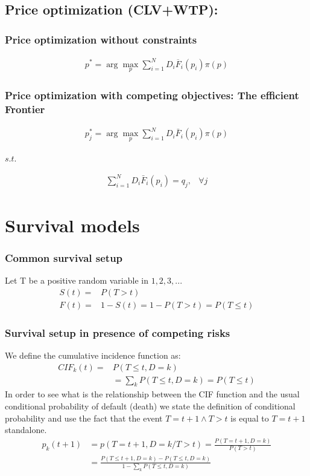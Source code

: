 \documentclass[12pt]{book}
\begin{document}
\section{Price optimization (CLV+WTP): }
\subsection{Price optimization without constraints}
\begin{align}
p^*= \arg \max_p \sum_{i=1}^N D_i\overline{F}_i(p_i)\pi(p)
\end{align}

\subsection{Price optimization with competing objectives: The efficient Frontier}

\begin{align}
p^*_j= \arg \max_p \sum_{i=1}^N D_i\bar{F}_i(p_i)\pi(p)
\end{align}
\begin{center}
    $s.t.$
\end{center}
\begin{align}
\sum_{i=1}^N D_i\bar{F}_i(p_i) =q_j,& \forall j
\end{align}


\chapter{Survival models}
\subsection{Common survival setup}
Let T be a positive random variable in $1,2,3,...$
\begin{align}
    S(t)=&P(T>t) \\
    F(t)=&1-S(t)=1-P(T>t)=P(T\leq t)
\end{align}
\subsection{Survival setup in presence of competing risks}

We define the cumulative incidence function as:
\begin{align}
    CIF_k(t)=&P(T\leq t,D=k) \\
    &=\sum_k P(T \leq t,D=k) = P(T \leq t)
\end{align}
In order to see what is the relationship between the CIF function and the usual conditional probability of default (death) we state the definition of conditional probability and use the fact that the event $T=t+1 \wedge T>t$ is equal to $T=t+1$ standalone.
\begin{align}
    p_k(t+1)&=p(T=t+1,D=k/T>t)=\frac{P(T=t+1,D=k)}{P(T>t)}\\
    &= \frac{ P(T \leq t+1,D=k)-P(T\leq t,D=k)}{
    1-\sum_k P(T \leq t, D=k)
    }
\end{align}
\end{document}
